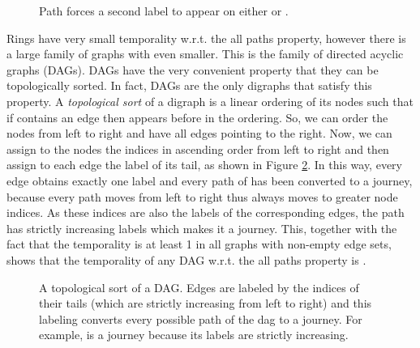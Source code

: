 \documentclass[oribibl, 11pt]{llncs}
\begin{document}
\begin{figure}[!hbtp]
\caption{Path  forces a second label to appear on either  or .} \label{fig:ring}
\end{figure}

Rings have very small temporality w.r.t. the all paths property, however there is a large family of graphs with even smaller. This is the family of directed acyclic graphs (DAGs). DAGs have the very convenient property that they can be topologically sorted. In fact, DAGs are the only digraphs that satisfy this property. A \emph{topological sort} of a digraph  is a linear ordering of its nodes such that if  contains an edge  then  appears before  in the ordering. So, we can order the nodes from left to right and have all edges pointing to the right.  Now, we can assign to the nodes the indices  in ascending order from left to right and then assign to each edge the label of its tail, as shown in Figure \ref{fig:dag}. In this way, every edge obtains exactly one label and every path of  has been converted to a journey, because every path moves from left to right thus always moves to greater node indices. As these indices are also the labels of the corresponding edges, the path has strictly increasing labels which makes it a journey. This, together with the fact that the temporality is at least 1 in all graphs with non-empty edge sets, shows that the temporality of any DAG w.r.t. the all paths property is .

\begin{figure}[!hbtp]
   \caption{A topological sort of a DAG. Edges are labeled by the indices of their tails (which are strictly increasing from left to right) and this labeling converts every possible path of the dag to a journey. For example,  is a journey because its labels  are strictly increasing.} \label{fig:dag}
\end{figure}
\end{document}
